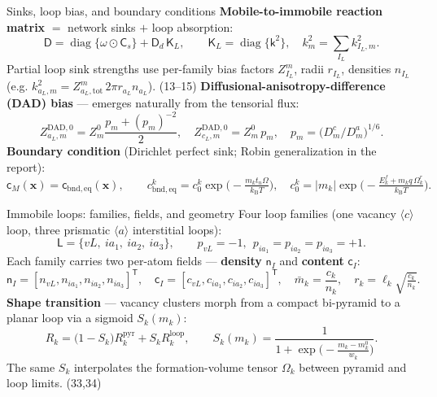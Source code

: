 \documentclass[aspectratio=169,10pt]{beamer}
\newcommand{\sa}[1]{\bm{\mathsf{#1}}}
\newcommand{\ca}[1]{\bm{#1}}
\newcommand{\kB}{k_{\mathrm B}}
\begin{document}
\begin{frame}{Sinks, loop bias, and boundary conditions}
\small
\textbf{Mobile-to-immobile reaction matrix} $=$ network sinks $+$ loop absorption:
\[
\sa{D}=\operatorname{diag}\{\sa{\omega}\odot\sa{C}_s\}+\sa{D}_d\,\sa{K}_L,
\qquad
\sa{K}_L=\operatorname{diag}\{\sa{k}^2\},\quad
k^2_m=\sum_{I_L} k^2_{I_L,m}. \tag{11,12}
\]
Partial loop sink strengths use per-family bias factors $Z^m_{I_L}$, radii $r_{I_L}$, densities $n_{I_L}$
(e.g. $k^2_{a_L,m}=Z^m_{a_L,\mathrm{tot}}\,2\pi r_{a_L}n_{a_L}$). \hfill (13--15)
\vfill
\textbf{Diffusional-anisotropy-difference (DAD) bias} — emerges naturally from the tensorial flux:
\[
Z^{\mathrm{DAD},0}_{a_L,m}=Z^0_m\frac{p_m+(p_m)^{-2}}{2},\quad
Z^{\mathrm{DAD},0}_{c_L,m}=Z^0_m\,p_m,\quad
p_m=\big(D^c_m/D^a_m\big)^{1/6}.\tag{16}
\]
\vfill
\textbf{Boundary condition} (Dirichlet perfect sink; Robin generalization in the report):
\[
\sa{c}_M(\ca{x})=\sa{c}_{\mathrm{bnd,eq}}(\ca{x}),\qquad
c^k_{\mathrm{bnd,eq}}=c^k_0\exp\!\Big(\!-\tfrac{m_k t_n\Omega}{\kB T}\Big),\quad
c^k_0=|m_k|\exp\!\Big(\!-\tfrac{E^f_k+m_k q\,\Omega^r_k}{\kB T}\Big).\tag{20--22}
\]
\end{frame}

\begin{frame}{Immobile loops: families, fields, and geometry}
\small
Four loop families (one vacancy $\langle c\rangle$ loop, three prismatic $\langle a\rangle$ interstitial loops):
\[
\mathsf L=\{vL,\ ia_1,\ ia_2,\ ia_3\},\qquad
p_{vL}=-1,\ \ p_{ia_1}=p_{ia_2}=p_{ia_3}=+1.\tag{23,24}
\]
Each family carries two per-atom fields — \textbf{density} $\sa{n}_I$ and \textbf{content} $\sa{c}_I$:
\[
\sa{n}_I=[n_{vL},n_{ia_1},n_{ia_2},n_{ia_3}]^{\mathsf T},\quad
\sa{c}_I=[c_{vL},c_{ia_1},c_{ia_2},c_{ia_3}]^{\mathsf T},\quad
\bar m_k=\frac{c_k}{n_k},\quad
r_k=\ell_k\sqrt{\tfrac{c_k}{n_k}}.\tag{25--28}
\]
\vfill
\textbf{Shape transition} — vacancy clusters morph from a compact bi-pyramid to a planar loop via a
sigmoid $S_k(m_k)$:
\[
R_k=\big(1-S_k\big)R^{\mathrm{pyr}}_k+S_k R^{\mathrm{loop}}_k,\qquad
S_k(m_k)=\frac{1}{1+\exp\!\big(-\frac{m_k-m^0_k}{w_k}\big)}.\tag{29,31}
\]
The same $S_k$ interpolates the formation-volume tensor $\Omega_k$ between pyramid and loop limits. \hfill (33,34)
\end{frame}
\end{document}
